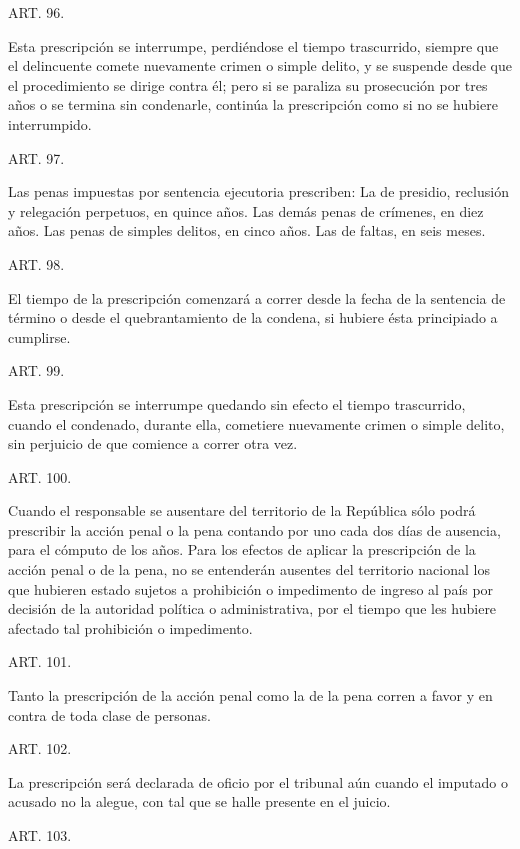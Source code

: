     ART. 96.
   
    Esta prescripción se interrumpe, perdiéndose el tiempo trascurrido, siempre que el delincuente comete nuevamente crimen o simple delito, y se suspende desde que el procedimiento se dirige contra él; pero si se paraliza su prosecución por tres años o se termina sin condenarle, continúa la prescripción como si no se hubiere interrumpido.


    ART. 97.

    Las penas impuestas por sentencia ejecutoria prescriben:
    La de presidio, reclusión y relegación perpetuos, en quince años.
    Las demás penas de crímenes, en diez años.
    Las penas de simples delitos, en cinco años.
    Las de faltas, en seis meses.




    ART. 98.

    El tiempo de la prescripción comenzará a correr desde la fecha de la sentencia de término o desde el quebrantamiento de la condena, si hubiere ésta principiado a cumplirse.


    ART. 99.

    Esta prescripción se interrumpe quedando sin efecto el tiempo trascurrido, cuando el condenado, durante ella, cometiere nuevamente crimen o simple delito, sin perjuicio de que comience a correr otra vez.



    ART. 100.

    Cuando el responsable se ausentare del territorio de la República sólo podrá prescribir la acción penal o la pena contando por uno cada dos días de ausencia, para el cómputo de los años.
    Para los efectos de aplicar la prescripción de la acción penal o de la pena, no se entenderán ausentes del territorio nacional los que hubieren estado sujetos a prohibición o impedimento de ingreso al país por decisión de la autoridad política o administrativa, por el tiempo que les hubiere afectado tal prohibición o impedimento.


    ART. 101.

    Tanto la prescripción de la acción penal como la de la pena corren a favor y en contra de toda clase de personas.


    ART. 102.

    La prescripción será declarada de oficio por el tribunal aún cuando el imputado o acusado no la alegue, con tal que se halle presente en el juicio.


    ART. 103.

